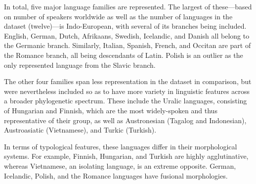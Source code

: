 \documentclass[12pt,a4paper]{article}
\numberwithin{figure}{section}
\numberwithin{table}{section}
\numberwithin{definition}{section}
\begin{document}


In total, five major language families are represented. The largest of these---based on number of speakers worldwide as well as the number of languages in the dataset (twelve)---is Indo-European, with several of its branches being included. English, German, Dutch, Afrikaans, Swedish, Icelandic, and Danish all belong to the Germanic branch. Similarly, Italian, Spanish, French, and Occitan are part of the Romance branch, all being descendants of Latin. Polish is an outlier as the only represented language from the Slavic branch. 

The other four families span less representation in the dataset in comparison, but were nevertheless included so as to have more variety in linguistic features across a broader phylogenetic spectrum. These include the Uralic languages, consisting of Hungarian and Finnish, which are the most widely-spoken and thus representative of their group, as well as Austronesian (Tagalog and Indonesian), Austroasiatic (Vietnamese), and Turkic (Turkish). 


In terms of typological features, these languages differ in their morphological systems. For example, Finnish, Hungarian, and Turkish are highly agglutinative, whereas Vietnamese, an isolating language, is an extreme opposite. German, Icelandic, Polish, and the Romance languages have fusional morphologies.

\end{document}
